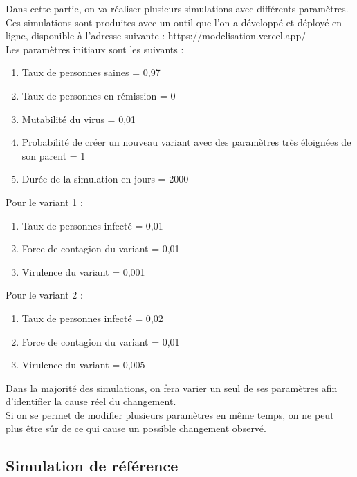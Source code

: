 \documentclass{article}
\begin{document}
Dans cette partie, on va réaliser plusieurs simulations avec différents paramètres. Ces simulations sont produites avec un outil que l'on a développé et déployé en ligne, disponible à l'adresse suivante : https://modelisation.vercel.app/ \\
Les paramètres initiaux sont les suivants : \\
\begin{enumerate}
    \item Taux de personnes saines = 0,97
    \item Taux de personnes en rémission = 0
    \item Mutabilité du virus = 0,01
    \item Probabilité de créer un nouveau variant avec des paramètres très éloignées de son parent = 1
    \item Durée de la simulation en jours = 2000\\
\end{enumerate}
Pour le variant 1 :
\begin{enumerate}
    \item Taux de personnes infecté = 0,01
    \item Force de contagion du variant = 0,01
    \item Virulence du variant = 0,001\\
\end{enumerate}
Pour le variant 2 :
\begin{enumerate}
    \item Taux de personnes infecté = 0,02
    \item Force de contagion du variant = 0,01
    \item Virulence du variant = 0,005\\
\end{enumerate}

Dans la majorité des simulations, on fera varier un seul de ses paramètres afin d'identifier la cause réel du changement. \\
Si on se permet de modifier plusieurs paramètres en même temps, on ne peut plus être sûr de ce qui cause un possible changement observé. \\

\subsection{Simulation de référence}
\end{document}
